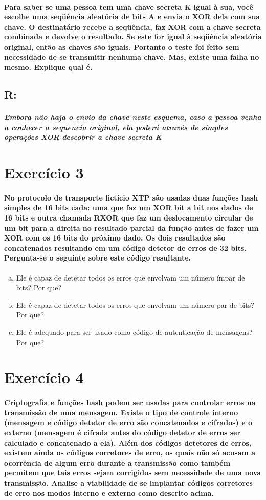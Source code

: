 \documentclass[10pt,a4paper]{report}
\begin{document}
\paragraph{Para saber se uma pessoa tem uma chave secreta K igual à sua, você escolhe uma seqüência aleatória de bits A e envia o XOR dela com sua chave. O destinatário recebe a seqüência, faz XOR com a chave secreta combinada e devolve o resultado. Se este for igual à seqüência aleatória original, então as chaves são iguais. Portanto o teste foi feito sem necessidade de se transmitir nenhuma chave. Mas, existe uma falha no mesmo. Explique qual é.}
\subsection*{R:}
\subparagraph{Embora não haja o envio da chave neste esquema, caso a pessoa venha a conhecer a sequencia original, ela poderá através de simples operações XOR descobrir a chave secreta K}

\section*{Exercício 3}
\paragraph{ No protocolo de transporte fictício XTP são usadas duas funções hash simples de 16 bits cada: uma que faz um XOR bit a bit nos dados de 16 bits e outra chamada RXOR que faz um deslocamento circular de um bit para a direita no resultado parcial da função antes de fazer um XOR com os 16 bits do próximo dado. Os dois resultados são concatenados resultando em um código detetor de erros de 32 bits. Pergunta-se o seguinte sobre este código resultante.}
\begin{enumerate}[(a)]
\item Ele é capaz de detetar todos os erros que envolvam um número ímpar de bits? Por que?
\item Ele é capaz de detetar todos os erros que envolvam um número par de bits? Por que?
\item Ele é adequado para ser usado como código de autenticação de mensagens? Por que?
\end{enumerate}

\section*{Exercício 4}
\paragraph{ Criptografia e funções hash podem ser usadas para controlar erros na transmissão de uma mensagem. Existe o tipo de controle interno (mensagem e código detetor de erro são concatenados e cifrados) e o externo (mensagem é cifrada antes do código detetor de erros ser calculado e concatenado a ela). Além dos códigos detetores de erros, existem ainda os códigos corretores de erro, os quais não só acusam a ocorrência de algum erro durante a transmissão como também permitem que tais erros sejam corrigidos sem necessidade de uma nova transmissão. Analise a viabilidade de se implantar códigos corretores de erro nos modos interno e externo como descrito acima.}
\end{document}
